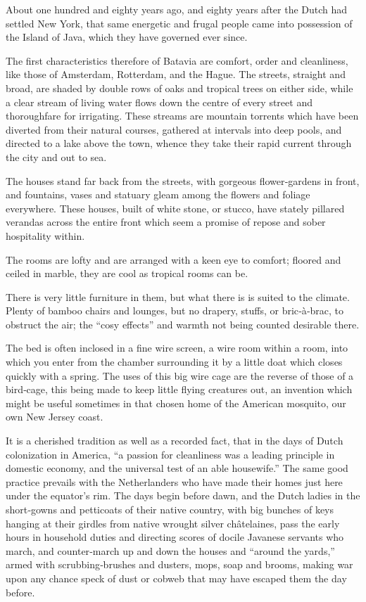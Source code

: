 \documentclass[12pt]{book}
\begin{document}
About one hundred and eighty years ago, and eighty years after the Dutch
had settled New York, that same energetic and frugal people came into possession
of the Island of Java, which they have governed ever since.

The first characteristics therefore of Batavia are comfort, order and cleanliness,
like those of Amsterdam, Rotterdam, and the Hague. The streets, straight and
broad, are shaded by double rows of oaks and tropical trees on either side, while a
clear stream of living water flows down the centre of every street and thoroughfare
for irrigating. These streams are mountain torrents which have been diverted
from their natural courses, gathered at intervals into deep pools, and directed to
a lake above the town, whence they take their rapid current through the city and
out to sea.

The houses stand far back from the streets, with gorgeous flower‐gardens
in front, and fountains, vases and statuary gleam among the flowers and foliage everywhere. These houses, built of white stone, or stucco, have stately
pillared verandas across the entire front which seem a promise of repose and
sober hospitality within.

The rooms are lofty and are arranged with a keen eye to comfort; floored and
ceiled in marble, they are cool as tropical rooms can be.

There is very little furniture in them, but what there is is suited to the climate.
Plenty of bamboo chairs and lounges, but no drapery, stuffs, or bric‐à‐brac, to
obstruct the air; the “cosy effects” and warmth not being counted desirable there.

The bed is often inclosed in a fine wire screen, a wire room within a room, into
which you enter from the chamber surrounding it by a little doat which closes
quickly with a spring. The uses of this big wire cage are the reverse of those of a
bird‐cage, this being made to keep little flying creatures out, an invention which
might be useful sometimes in that chosen home of the American mosquito, our
own New Jersey coast.

It is a cherished tradition as well as a recorded fact, that in the days of Dutch
colonization in America, “a passion for cleanliness was a leading principle in
domestic economy, and the universal test of an able housewife.” The same good
practice prevails with the Netherlanders who have made their homes just here
under the equator’s rim. The days begin before dawn, and the Dutch ladies in
the short‐gowns and petticoats of their native country, with big bunches of keys
hanging at their girdles from native wrought silver châtelaines, pass the early
hours in household duties and directing scores of docile Javanese servants who
march, and counter‐march up and down the houses and “around the yards,” armed
with scrubbing‐brushes and dusters, mops, soap and brooms, making war upon
any chance speck of dust or cobweb that may have escaped them the day before.
\end{document}
